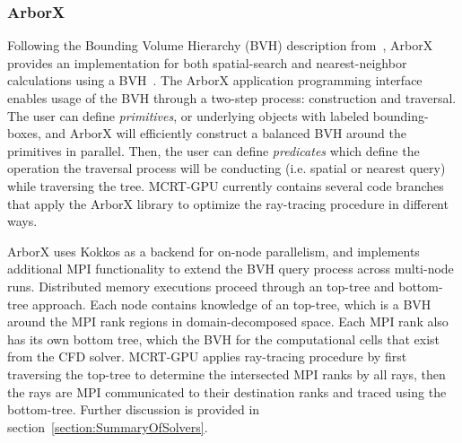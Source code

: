 \subsubsection{ArborX}
Following the Bounding Volume Hierarchy (BVH) description from~\citet{Karras2012MaximizingTrees}, ArborX provides an implementation for both spatial-search and nearest-neighbor calculations using a BVH~\cite{Lebrun-Grandie2019ArborX:Library}. 
The ArborX application programming interface enables usage of the BVH through a two-step process: construction and traversal. The user can define \textit{primitives}, or underlying objects with labeled bounding-boxes, and ArborX will efficiently construct a balanced BVH around the primitives in parallel. Then, the user can define \textit{predicates} which define the operation the traversal process will be conducting (i.e. spatial or nearest query) while traversing the tree.
MCRT-GPU currently contains several code branches that apply the ArborX library to optimize the ray-tracing procedure in different ways.

ArborX uses Kokkos as a backend for on-node parallelism, and implements additional MPI functionality to extend the BVH query process across multi-node runs. Distributed memory executions proceed through an top-tree and bottom-tree approach.
Each node contains knowledge of an top-tree, which is a BVH around the MPI rank regions in domain-decomposed space. Each MPI rank also has its own bottom tree, which the BVH for the computational cells that exist from the CFD solver.
MCRT-GPU applies ray-tracing procedure by first traversing the top-tree to determine the intersected MPI ranks by all rays, then the rays are MPI communicated to their destination ranks and traced using the bottom-tree. Further discussion is provided in section~\ref{section:SummaryOfSolvers}.




